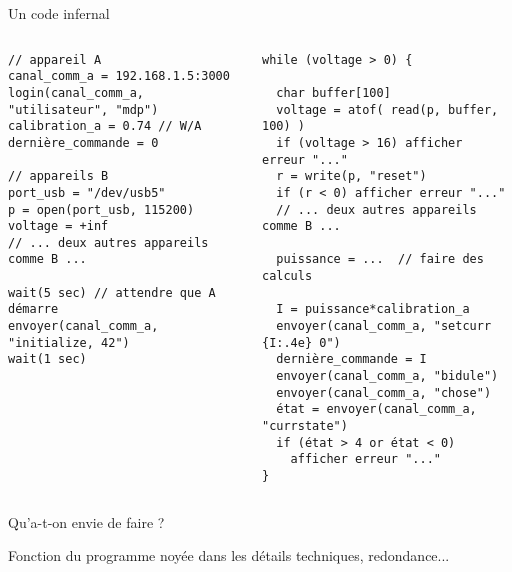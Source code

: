 \documentclass[c]{beamer}
\begin{document}
\begin{frame}[fragile]{Un code infernal}

  \begin{columns}[t]
    \hspace{-0.8cm} 
    \begin{column}{0.6\textwidth}
      \begin{verbatim}
// appareil A
canal_comm_a = 192.168.1.5:3000
login(canal_comm_a, "utilisateur", "mdp")
calibration_a = 0.74 // W/A
dernière_commande = 0

// appareils B
port_usb = "/dev/usb5"
p = open(port_usb, 115200)
voltage = +inf
// ... deux autres appareils comme B ...

wait(5 sec) // attendre que A démarre
envoyer(canal_comm_a, "initialize, 42")
wait(1 sec)
        \end{verbatim}
    \end{column}
    \hspace{-0.6cm} 
    \begin{column}{0.6\textwidth}
      \begin{verbatim}
while (voltage > 0) {
  
  char buffer[100]
  voltage = atof( read(p, buffer, 100) )
  if (voltage > 16) afficher erreur "..."
  r = write(p, "reset")
  if (r < 0) afficher erreur "..."
  // ... deux autres appareils comme B ...

  puissance = ...  // faire des calculs

  I = puissance*calibration_a
  envoyer(canal_comm_a, "setcurr {I:.4e} 0")
  dernière_commande = I
  envoyer(canal_comm_a, "bidule")
  envoyer(canal_comm_a, "chose")
  état = envoyer(canal_comm_a, "currstate")
  if (état > 4 or état < 0)
    afficher erreur "..."
}
        \end{verbatim}
    \end{column}
  \end{columns}
\end{frame}


\begin{frame}[fragile]{Qu'a-t-on envie de faire ?}

Fonction du programme noyée dans les détails techniques, redondance...

\end{frame}
\end{document}
